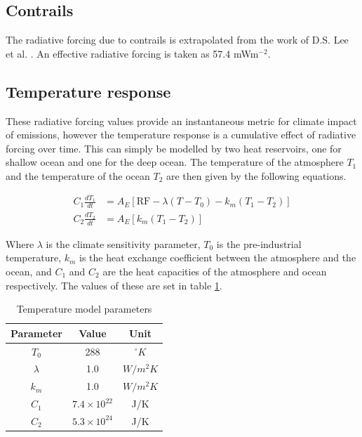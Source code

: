 \documentclass{article}
\begin{document}
\subsection{Contrails}

The radiative forcing due to contrails is extrapolated from the work of D.S. Lee et al. \cite{contrail_radiative_forcing}.
An effective radiative forcing is taken as 57.4 mWm$^{-2}$.


\subsection{Temperature response}

These radiative forcing values provide an instantaneous metric for climate impact of emissions, however
the temperature response is a cumulative effect of radiative forcing over time.
This can simply be modelled by two heat reservoirs, one for shallow ocean and one for the deep ocean.
The temperature of the atmosphere $T_1$ and the temperature of the ocean $T_2$ are then given by the following equations.

\begin{align}
    C_1 \frac{dT_1}{dt} &= A_E[\text{RF} - \lambda(T - T_0) - k_m(T_1 - T_2)] \\
    C_2 \frac{dT_2}{dt} &= A_E[k_m(T_1 - T_2)]
\end{align}

Where $\lambda$ is the climate sensitivity parameter, $T_0$ is the pre-industrial temperature, $k_m$ is the heat exchange coefficient between the atmosphere and the ocean, and $C_1$ and $C_2$ are the heat capacities of the atmosphere and ocean respectively.
The values of these are set in table \ref{tab:temp_model_params}.

\begin{table}[H]
    \centering
    \begin{tabular}{ccc}
        \hline
        Parameter & Value & Unit \\
        \hline
        $T_0$ & 288 & $^\circ K$ \\
        $\lambda$ & 1.0 & $W/m^2K$ \\
        $k_m$ & 1.0 & $W/m^2K$ \\
        $C_1$ & $7.4\times 10^{22}$ & J/K \\
        $C_2$ & $5.3\times 10^{24}$ & J/K \\
        \hline
    \end{tabular}
    \caption{Temperature model parameters}
    \label{tab:temp_model_params}
\end{table}
\end{document}
